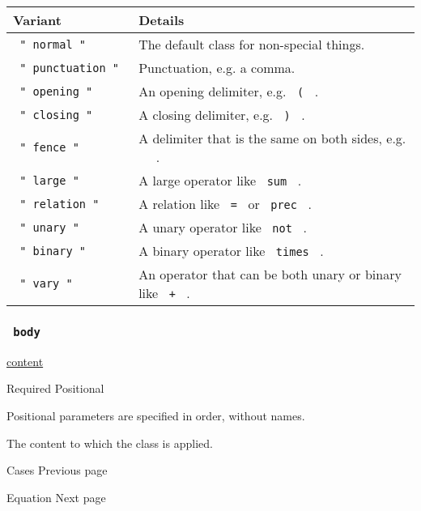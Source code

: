 \begin{longtable}[]{@{}ll@{}}
\toprule\noalign{}
Variant & Details \\
\midrule\noalign{}
\endhead
\bottomrule\noalign{}
\endlastfoot
\texttt{\ "\ normal\ "\ } & The default class for non-special things. \\
\texttt{\ "\ punctuation\ "\ } & Punctuation, e.g. a comma. \\
\texttt{\ "\ opening\ "\ } & An opening delimiter, e.g. \texttt{\ (\ }
. \\
\texttt{\ "\ closing\ "\ } & A closing delimiter, e.g. \texttt{\ )\ }
. \\
\texttt{\ "\ fence\ "\ } & A delimiter that is the same on both sides,
e.g. \texttt{\ \textbar{}\ } . \\
\texttt{\ "\ large\ "\ } & A large operator like \texttt{\ sum\ } . \\
\texttt{\ "\ relation\ "\ } & A relation like \texttt{\ =\ } or
\texttt{\ prec\ } . \\
\texttt{\ "\ unary\ "\ } & A unary operator like \texttt{\ not\ } . \\
\texttt{\ "\ binary\ "\ } & A binary operator like \texttt{\ times\ }
. \\
\texttt{\ "\ vary\ "\ } & An operator that can be both unary or binary
like \texttt{\ +\ } . \\
\end{longtable}

\subsubsection{\texorpdfstring{\texttt{\ body\ }}{ body }}\label{parameters-body}

\href{/docs/reference/foundations/content/}{content}

{Required} {{ Positional }}

\label{parameters-body-positional-tooltip}
Positional parameters are specified in order, without names.

The content to which the class is applied.

\href{/docs/reference/math/cases/}{\pandocbounded{}}

{ Cases } { Previous page }

\href{/docs/reference/math/equation/}{\pandocbounded{}}

{ Equation } { Next page }


